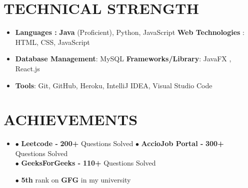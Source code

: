 \documentclass[letterpaper,11pt]{article}
\newcommand{\resumeSubHeadingListStart}{\begin{itemize}[leftmargin=0.0in, label={}]}
\newcommand{\resumeSubHeadingListEnd}{\end{itemize}}
\begin{document}
\section{TECHNICAL STRENGTH}
 \resumeSubHeadingListStart
   \item{
     \textbf{Languages :}{  \textbf{Java} (Proficient), Python, JavaScript}
     \hfill
     \textbf{Web Technologies    }{: HTML, CSS, JavaScript }
   }
   \vspace{-5pt}
   \item{
     \textbf{Database Management}{: MySQL}
     \hfill
     \textbf{Frameworks/Library}{: JavaFX , React.js }
    }
    \vspace{-5pt}
   \item{
     \textbf{Tools}{: Git, GitHub, Heroku, IntelliJ IDEA, Visual Studio Code}
     \hfill
     \textbf{}{}
   }
 \resumeSubHeadingListEnd



 \vspace{-6pt}


 
\section{ACHIEVEMENTS}

\resumeSubHeadingListStart
   \item{
   \begin{description}[font=$\bullet$]

     $\bullet$ \textbf{Leetcode -}{ \textbf{200+} Questions Solved}
      \hspace{2cm}
     $\bullet$ \textbf{AccioJob Portal - }{\textbf{300+} Questions Solved }  \\
     $\bullet$ \textbf{GeeksForGeeks - }{\textbf{110+} Questions Solved }
      
  \end{description}
   }
   \hspace{0.85cm}$\bullet${ \textbf{5th} rank on \textbf{GFG} in my university}
\resumeSubHeadingListEnd
\end{document}
